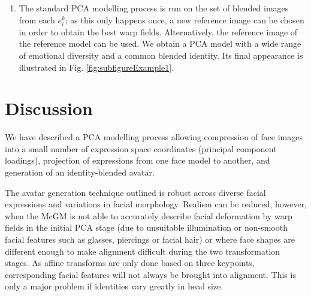 \documentclass[runningheads]{llncs}
\begin{document}
\begin{enumerate}
\item The standard PCA modelling process is run on the set of blended images from each $e^k_i$; as this only happens once, a new reference image can be chosen in order to obtain the best warp fields. Alternatively, the reference image of the reference model can be used. We obtain a PCA model with a wide range of emotional diversity and a common blended identity. Its final appearance is illustrated in Fig. \ref{fig:subfigureExample1}.

\end{enumerate}


%	

\section{Discussion}

We have described a PCA modelling process allowing compression of face images into a small number of expression space coordinates (principal component loadings), projection of expressions from one face model to another, and generation of an identity-blended avatar. 



The avatar generation technique outlined is robust across diverse facial expressions and variations in facial morphology. Realism can be reduced, however, when the McGM is not able to accurately describe facial deformation by warp fields in the initial PCA stage (due to unsuitable illumination or non-smooth facial features such as glasses, piercings or facial hair) or where face shapes are different enough to make alignment difficult during the two transformation stages. As affine transforms are only done based on three keypoints, corresponding facial features will not always be brought into alignment. This is only a major problem if identities vary greatly in head size.
\end{document}

